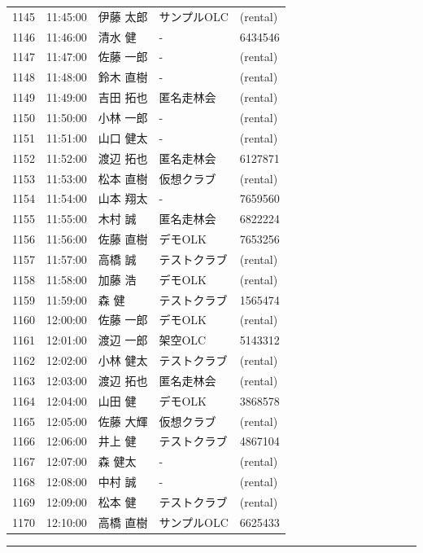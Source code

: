 \documentclass[a4paper,10pt]{ltjsarticle}
\newcommand{\laneheading}[1]{%
  \par\vspace{10pt}%
  \noindent\textcolor{rule}{\rule{2.5mm}{3.4mm}}\hspace{0.5em}{\LARGE\bfseries #1}%
  \par\vspace{4pt}%
}
\begin{document}
\begin{longtable}{rl>{\raggedright\arraybackslash}p{}>{\raggedright\arraybackslash}p{}l}
1145 & 11:45:00 & 伊藤 太郎 & サンプルOLC & (rental) \\
1146 & 11:46:00 & 清水 健 & - & 6434546 \\
1147 & 11:47:00 & 佐藤 一郎 & - & (rental) \\
1148 & 11:48:00 & 鈴木 直樹 & - & (rental) \\
1149 & 11:49:00 & 吉田 拓也 & 匿名走林会 & (rental) \\
1150 & 11:50:00 & 小林 一郎 & - & (rental) \\
1151 & 11:51:00 & 山口 健太 & - & (rental) \\
1152 & 11:52:00 & 渡辺 拓也 & 匿名走林会 & 6127871 \\
1153 & 11:53:00 & 松本 直樹 & 仮想クラブ & (rental) \\
1154 & 11:54:00 & 山本 翔太 & - & 7659560 \\
1155 & 11:55:00 & 木村 誠 & 匿名走林会 & 6822224 \\
1156 & 11:56:00 & 佐藤 直樹 & デモOLK & 7653256 \\
1157 & 11:57:00 & 高橋 誠 & テストクラブ & (rental) \\
1158 & 11:58:00 & 加藤 浩 & デモOLK & (rental) \\
1159 & 11:59:00 & 森 健 & テストクラブ & 1565474 \\
1160 & 12:00:00 & 佐藤 一郎 & デモOLK & (rental) \\
1161 & 12:01:00 & 渡辺 一郎 & 架空OLC & 5143312 \\
1162 & 12:02:00 & 小林 健太 & テストクラブ & (rental) \\
1163 & 12:03:00 & 渡辺 拓也 & 匿名走林会 & (rental) \\
1164 & 12:04:00 & 山田 健 & デモOLK & 3868578 \\
1165 & 12:05:00 & 佐藤 大輝 & 仮想クラブ & (rental) \\
1166 & 12:06:00 & 井上 健 & テストクラブ & 4867104 \\
1167 & 12:07:00 & 森 健太 & - & (rental) \\
1168 & 12:08:00 & 中村 誠 & - & (rental) \\
1169 & 12:09:00 & 松本 健 & テストクラブ & (rental) \\
1170 & 12:10:00 & 高橋 直樹 & サンプルOLC & 6625433 \\
\end{longtable}

\laneheading{Lane 2}
\end{document}
